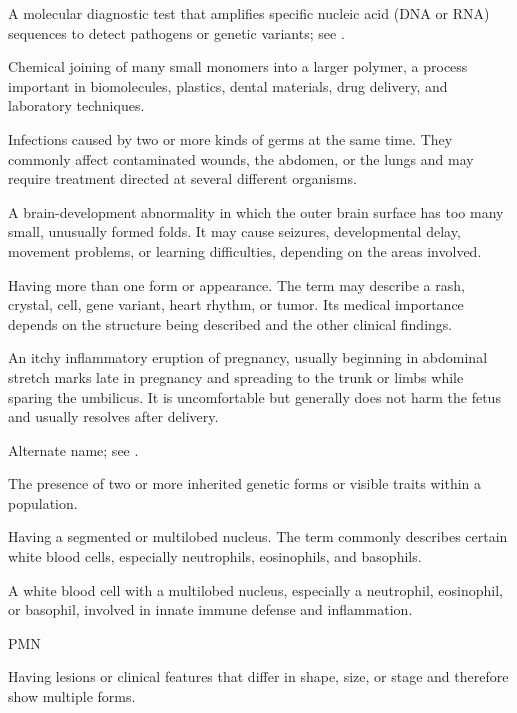 A molecular diagnostic test that amplifies specific nucleic acid (DNA or RNA) sequences to detect pathogens or genetic variants; see .

 Chemical joining of many small monomers into a larger polymer, a process important in biomolecules, plastics, dental materials, drug delivery, and laboratory techniques.

 Infections caused by two or more kinds of germs at the same time. They commonly affect contaminated wounds, the abdomen, or the lungs and may require treatment directed at several different organisms.

 A brain-development abnormality in which the outer brain surface has too many small, unusually formed folds. It may cause seizures, developmental delay, movement problems, or learning difficulties, depending on the areas involved.

 Having more than one form or appearance. The term may describe a rash, crystal, cell, gene variant, heart rhythm, or tumor. Its medical importance depends on the structure being described and the other clinical findings.

 An itchy inflammatory eruption of pregnancy, usually beginning in abdominal stretch marks late in pregnancy and spreading to the trunk or limbs while sparing the umbilicus. It is uncomfortable but generally does not harm the fetus and usually resolves after delivery.

 Alternate name; see .

 The presence of two or more inherited genetic forms or visible traits within a population.

 Having a segmented or multilobed nucleus. The term commonly describes certain white blood cells, especially neutrophils, eosinophils, and basophils.

 A white blood cell with a multilobed nucleus, especially a neutrophil, eosinophil, or basophil, involved in innate immune defense and inflammation.

\synonyms
PMN

 Having lesions or clinical features that differ in shape, size, or stage and therefore show multiple forms.

